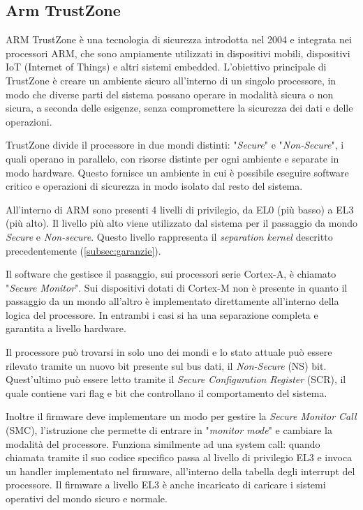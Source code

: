 \documentclass[12pt,italian]{report}
\begin{document}
	\subsection{Arm TrustZone}
	\label{subsec:trustzone}
	ARM TrustZone è una tecnologia di sicurezza introdotta nel 2004 e integrata nei processori ARM, che sono ampiamente utilizzati in dispositivi mobili, dispositivi IoT (Internet of Things) e altri sistemi embedded. L'obiettivo principale di TrustZone è creare un ambiente sicuro all'interno di un singolo processore, in modo che diverse parti del sistema possano operare in modalità sicura o non sicura, a seconda delle esigenze, senza compromettere la sicurezza dei dati e delle operazioni.
	
	TrustZone divide il processore in due mondi distinti: "\textit{Secure}" e "\textit{Non-Secure}", i quali operano in parallelo, con risorse distinte per ogni ambiente e separate in modo hardware. Questo fornisce un ambiente in cui è possibile eseguire software critico e operazioni di sicurezza in modo isolato dal resto del sistema.
	
	All'interno di ARM sono presenti 4 livelli di privilegio, da EL0 (più basso) a EL3 (più alto). Il livello più alto viene utilizzato dal sistema per il passaggio da mondo \textit{Secure} e \textit{Non-secure}. Questo livello rappresenta il \textit{separation kernel} descritto precedentemente (\ref{subsec:garanzie}).
	
	Il software che gestisce il passaggio, sui processori serie Cortex-A, è chiamato "\textit{Secure Monitor}". Sui dispositivi dotati di Cortex-M non è presente in quanto il passaggio da un mondo all'altro è implementato direttamente all'interno della logica del processore. In entrambi i casi si ha una separazione completa e garantita a livello hardware.
	
	\bigbreak
	
	Il processore può trovarsi in solo uno dei mondi e lo stato attuale può essere rilevato tramite un nuovo bit presente sul bus dati, il \textit{Non-Secure} (NS) bit. Quest'ultimo può essere letto tramite il \textit{Secure Configuration Register} (SCR), il quale contiene vari flag e bit che controllano il comportamento del sistema. 
	
	Inoltre il firmware deve implementare un modo per gestire la \textit{Secure Monitor Call} (SMC), l'istruzione che permette di entrare in "\textit{monitor mode}" e cambiare la modalità del processore. Funziona similmente ad una system call: quando chiamata tramite il suo codice specifico passa al livello di privilegio EL3 e invoca un handler implementato nel firmware, all'interno della tabella degli interrupt del processore.
	Il firmware a livello EL3 è anche incaricato di caricare i sistemi operativi del mondo sicuro e normale.
	
\end{document}
